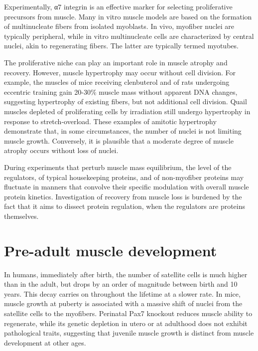 \documentclass[12pt,english]{report}\usepackage[]{graphicx}\usepackage[]{color}
\begin{document}
Experimentally, α7 integrin is an effective marker for selecting proliferative
precursors from muscle\citep{blanco-bose2001purification}. Many in
vitro muscle models are based on the formation of multinucleate fibers
from isolated myoblasts. In vivo, myofiber nuclei are typically peripheral,
while in vitro multinucleate cells are characterized by central nuclei,
akin to regenerating fibers. The latter are typically termed myotubes.

The proliferative niche can play an important role in muscle atrophy
and recovery. However, muscle hypertrophy may occur without cell division.
For example, the muscles of mice receiving clenbuterol and of rats
undergoing eccentric training gain 20-30\% muscle mass without apparent
DNA changes\citep{sharma1997response,wong1990protein}, suggesting
hypertrophy of existing fibers, but not additional cell division.
Quail muscles depleted of proliferating cells by irradiation still
undergo hypertrophy in response to stretch-overload\citep{lowe1999stretch-induced}.
These examples of amitotic hypertrophy demonstrate that, in some circumstances,
the number of nuclei is not limiting muscle growth. Conversely, it
is plausible that a moderate degree of muscle atrophy occurs without
loss of nuclei.

During experiments that perturb muscle mass equilibrium, the level
of the regulators, of typical housekeeping proteins, and of non-myofiber
proteins may fluctuate in manners that convolve their specific modulation
with overall muscle protein kinetics. Investigation of recovery from
muscle loss is burdened by the fact that it aims to dissect protein
regulation, when the regulators are proteins themselves.


\section{Pre-adult muscle development}

In humans, immediately after birth, the number of satellite cells
is much higher than in the adult, but drops by an order of magnitude
between birth and 10 years\citep{verdijk2014satellite}. This decay
carries on throughout the lifetime at a slower rate. In mice, muscle
growth at puberty is associated with a massive shift of nuclei from
the satellite cells to the myofibers\citep{neal2012satellite}. Perinatal
Pax7 knockout reduces muscle ability to regenerate, while its genetic
depletion in utero or at adulthood does not exhibit pathological traits\citep{lepper2009adult},
suggesting that juvenile muscle growth is distinct from muscle development
at other ages. 
\end{document}
